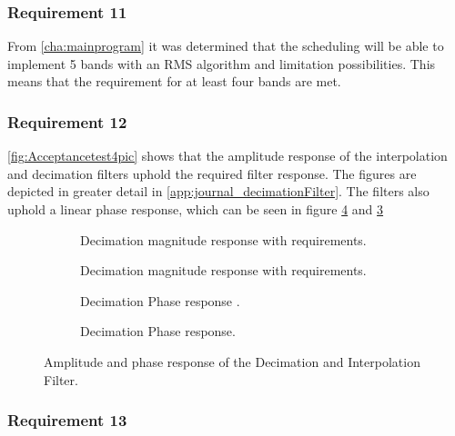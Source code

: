 \subsubsection*{Requirement 11}

From \autoref{cha:mainprogram} it was determined that the scheduling will be able to implement 5 bands with an RMS algorithm and limitation possibilities. This means that the requirement for at least four bands are met. 
\vspace*{-5mm}
\subsubsection*{Requirement 12}
\autoref{fig:Acceptancetest4pic} shows that the amplitude response of the interpolation and decimation filters uphold the required filter response. The figures are depicted in greater detail in \autoref{app:journal_decimationFilter}. The filters also uphold a linear phase response, which can be seen in figure \ref{fig:AcceptIntPhase2} and \ref{fig:AcceptDecPhase2}
\begin{figure}[H]
\centering
\begin{subfigure}[t]{0.45\textwidth}
	\centering
	
	\caption{Decimation magnitude response with requirements.}
	\label{fig:acceptDecMag2}
\end{subfigure}
\hfill
\begin{subfigure}[t]{0.45\textwidth}
	\centering
	
	\caption{Decimation magnitude response with requirements.}
	\label{fig:acceptIntMag2}
\end{subfigure} 
\begin{subfigure}[t]{0.45\textwidth}
	\centering
	
	\caption{Decimation Phase response .}
	\label{fig:AcceptDecPhase2}
\end{subfigure} 
\hfill
\begin{subfigure}[t]{0.45\textwidth}
	\centering
	
	\caption{Decimation Phase response.}
	\label{fig:AcceptIntPhase2}
\end{subfigure} 
\caption{Amplitude and phase response of the Decimation and Interpolation Filter.}
\label{fig:Acceptancetest4pic}
\end{figure}
\vspace*{-5mm}
\subsubsection*{Requirement 13}

